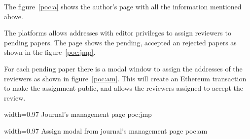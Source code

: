 The figure~\ref{poc:a} shows the author's page with all the information
mentioned above.


The platforms allows addresses with editor privileges to assign reviewers to
pending papers. The page shows the pending, accepted an rejected papers as shown
in the figure~\ref{poc:jmp}.

For each pending paper there is a modal window to assign the addresses of the reviewers
as shown in figure~\ref{poc:am}. This will create an Ethereum transaction to
make the assignment public, and allows the reviewers assigned to accept the
review.

%
{width=0.97\linewidth}%
{Journal's management page}%
{poc:jmp}

%
{width=0.97\linewidth}%
{Assign modal from journal's management page}%
{poc:am}


